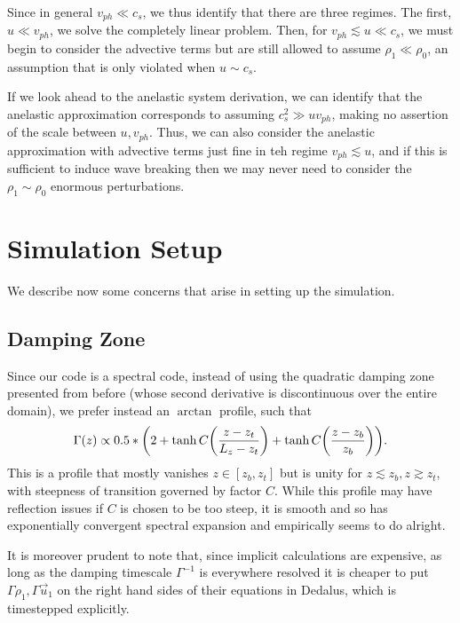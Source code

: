 \documentclass[11pt,
        usenames, %
        dvipsnames %
    ]{report}
\DeclarePairedDelimiter\p{\lparen}{\rparen}
\begin{document}
Since in general $v_{ph} \ll c_s$, we thus identify that there are three
regimes. The first, $u \ll v_{ph}$, we solve the completely linear problem.
Then, for $v_{ph} \lesssim u \ll c_s$, we must begin to consider the advective
terms but are still allowed to assume $\rho_1 \ll \rho_0$, an assumption that is
only violated when $u \sim c_s$.

If we look ahead to the anelastic system derivation, we can identify that the
anelastic approximation corresponds to assuming $c_s^2 \gg uv_{ph}$, making no
assertion of the scale between $u, v_{ph}$. Thus, we can also consider the
anelastic approximation with advective terms just fine in teh regime $v_{ph}
\lesssim u$, and if this is sufficient to induce wave breaking then we may never
need to consider the $\rho_1 \sim \rho_0$ enormous perturbations.

\chapter{Simulation Setup}

We describe now some concerns that arise in setting up the simulation.

\section{Damping Zone}

Since our code is a spectral code, instead of using the quadratic damping zone
presented from before (whose second derivative is discontinuous over the entire
domain), we prefer instead an $\arctan$ profile, such that
\begin{equation}
    \Gamma(z) \propto 0.5 * \p*{
        2 + \tanh C\p*{\frac{z - z_t}{L_z - z_t}}
            + \tanh C\p*{\frac{z - z_b}{z_b}}}.
\end{equation}
This is a profile that mostly vanishes $z \in [z_b, z_t]$ but is unity for $z
\lesssim z_b, z \gtrsim z_t$, with steepness of transition governed by factor
$C$. While this profile may have reflection issues if $C$ is chosen to be too
steep, it is smooth and so has exponentially convergent spectral expansion and
empirically seems to do alright.

It is moreover prudent to note that, since implicit calculations are expensive,
as long as the damping timescale $\Gamma^{-1}$ is everywhere resolved it is
cheaper to put $\Gamma \rho_1, \Gamma \vec{u}_1$ on the right hand sides of
their equations in Dedalus, which is timestepped explicitly.
\end{document}
